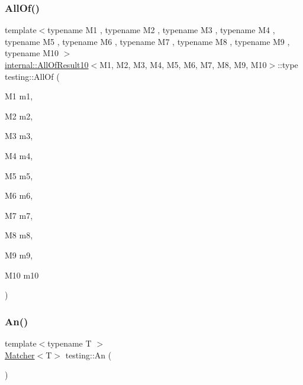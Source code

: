 \mbox{\label{namespacetesting_a9939c08664efeed0c1983090115f7ecb}} 
\subsubsection{\texorpdfstring{All\+Of()}{AllOf()}\hspace{0.1cm}{\footnotesize\ttfamily [9/9]}}
{\footnotesize\ttfamily template$<$typename M1 , typename M2 , typename M3 , typename M4 , typename M5 , typename M6 , typename M7 , typename M8 , typename M9 , typename M10 $>$ \\
\hyperlink{structtesting_1_1internal_1_1_all_of_result10}{internal\+::\+All\+Of\+Result10}$<$M1, M2, M3, M4, M5, M6, M7, M8, M9, M10$>$\+::type testing\+::\+All\+Of (\begin{DoxyParamCaption}\item[{M1}]{m1,  }\item[{M2}]{m2,  }\item[{M3}]{m3,  }\item[{M4}]{m4,  }\item[{M5}]{m5,  }\item[{M6}]{m6,  }\item[{M7}]{m7,  }\item[{M8}]{m8,  }\item[{M9}]{m9,  }\item[{M10}]{m10 }\end{DoxyParamCaption})\hspace{0.3cm}{\ttfamily [inline]}}

\mbox{\label{namespacetesting_a48792471ff9cdf5b4f95a4242df7bfbb}} 
\subsubsection{\texorpdfstring{An()}{An()}}
{\footnotesize\ttfamily template$<$typename T $>$ \\
\hyperlink{classtesting_1_1_matcher}{Matcher}$<$T$>$ testing\+::\+An (\begin{DoxyParamCaption}{ }\end{DoxyParamCaption})\hspace{0.3cm}{\ttfamily [inline]}}

\mbox{\label{namespacetesting_aa1f8a6371097e1e9b8d6866020f35252}} 

